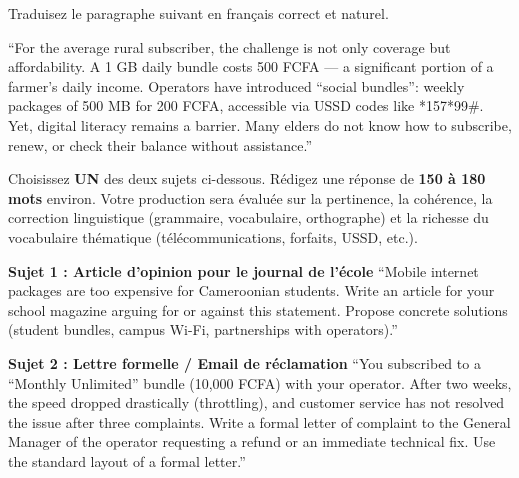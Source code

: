 \documentclass[11pt]{article}
\begin{document}
\begin{exercice}
Traduisez le paragraphe suivant en français correct et naturel.
\begin{textebox}
``For the average rural subscriber, the challenge is not only coverage but affordability. A 1 GB daily bundle costs 500 FCFA — a significant portion of a farmer's daily income. Operators have introduced ``social bundles'': weekly packages of 500 MB for 200 FCFA, accessible via USSD codes like *157*99\#. Yet, digital literacy remains a barrier. Many elders do not know how to subscribe, renew, or check their balance without assistance.''
\end{textebox}
\end{exercice}

\begin{exercice}
Choisissez \textbf{UN} des deux sujets ci-dessous. Rédigez une réponse de \textbf{150 à 180 mots} environ. Votre production sera évaluée sur la pertinence, la cohérence, la correction linguistique (grammaire, vocabulaire, orthographe) et la richesse du vocabulaire thématique (télécommunications, forfaits, USSD, etc.).

\textbf{Sujet 1 : Article d'opinion pour le journal de l'école}
``Mobile internet packages are too expensive for Cameroonian students. Write an article for your school magazine arguing for or against this statement. Propose concrete solutions (student bundles, campus Wi-Fi, partnerships with operators).''

\textbf{Sujet 2 : Lettre formelle / Email de réclamation}
``You subscribed to a ``Monthly Unlimited'' bundle (10,000 FCFA) with your operator. After two weeks, the speed dropped drastically (throttling), and customer service has not resolved the issue after three complaints. Write a formal letter of complaint to the General Manager of the operator requesting a refund or an immediate technical fix. Use the standard layout of a formal letter.''
\end{exercice}
\end{document}
